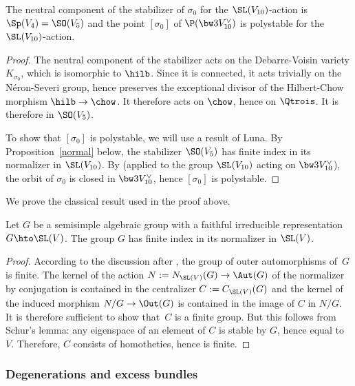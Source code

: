 \begin{prop}\label{coronouveau}
The neutral component of the stabilizer of $\sigma_0$ for the $\SL(V_{10})$-action is $\Sp(V_4)=\SO(V_5)$ and the point $[\sigma_0]$ of $\P(\bw3V_{10}^\vee)$ is polystable for the $\SL(V_{10})$-action.
\end{prop}

\begin{proof}
The neutral component of the stabilizer acts on the Debarre-Voisin variety $K_{\sigma_0}$, which is isomorphic to $\hilb$. Since it is connected, it acts trivially on the Néron-Severi group, hence preserves the exceptional divisor of the Hilbert-Chow morphism $\hilb\to \chow$. It therefore acts on $\chow$, hence on $\Qtrois$. It is therefore in $\SO(V_5)$.

To show that $[\sigma_0]$ is polystable, we will use a result of Luna. By Proposition~\ref{normal} below, the stabilizer $\SO(V_5)$ has finite index in its normalizer in
$\SL(V_{10})$. By
\cite[Cor.\,3]{luna} (applied to the group $ \SL(V_{10})$ acting on $\bw3V_{10}^\vee $), the orbit of $\sigma_0$ is closed in $\bw3V_{10}^\vee $, hence $[\sigma_0]$ is polystable.
\end{proof}

We prove the classical result used in the proof above.

\begin{prop}\label{normal}
Let $G$ be a semisimple algebraic group with a faithful irreducible representation $G\hto \SL(V)$. The group $G$ has finite index in its normalizer in $\SL(V)$.
\end{prop}

\begin{proof}
According to the discussion after \cite[Lem.\,16.3.8]{spring}, the group of outer automorphisms of~$G$ is finite. The kernel of the action $N:=N_{\SL(V)}(G)\to \Aut(G)$ of the normalizer by conjugation is contained in the centralizer $C:=C_{\SL(V)}(G)$ and the kernel of the induced morphism \mbox{$N/G\to \Out(G)$} is contained in the image of $C$ in $N/G$. It is therefore sufficient to show that~$C$ is a finite group. But this follows from Schur's lemma: any eigenspace of an element of $C$ is stable by $G$, hence equal to~$V$. Therefore, $C$ consists of homotheties, hence is finite.
\end{proof}

\subsubsection{Degenerations and excess bundles}\label{seconepartohivert}


